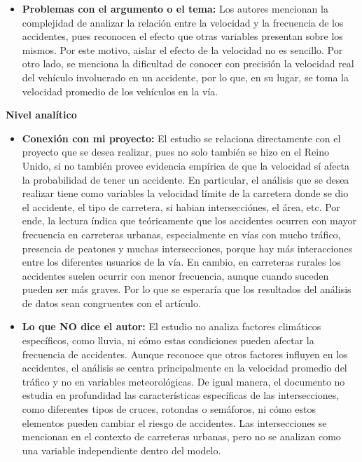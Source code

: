 \documentclass[12pt]{article}
\begin{document}
\begin{itemize}
    \item \textbf{Problemas con el argumento o el tema:} Los autores mencionan la complejidad de analizar la relación entre la velocidad y la frecuencia de los accidentes, pues reconocen el efecto que otras variables presentan sobre los mismos. Por este motivo, aislar el efecto de la velocidad no es sencillo. Por otro lado, se menciona la dificultad de conocer con precisión la velocidad real del vehículo involucrado en un accidente, por lo que, en su lugar, se toma la velocidad promedio de los vehículos en la vía.  \\
    \end{itemize}

\textbf{Nivel analítico}

\begin{itemize}
  \item \textbf{Conexión con mi proyecto:} El estudio se relaciona directamente con el proyecto que se desea realizar, pues no solo también se hizo en el Reino Unido, si no también provee evidencia empírica de que la velocidad sí afecta la probabilidad de tener un accidente. En particular, el análisis que se desea realizar tiene como variables la velocidad límite de la carretera donde se dio el accidente, el tipo de carretera, si habian intersecciónes, el área, etc. Por ende, la lectura índica que teóricamente que los accidentes ocurren con mayor frecuencia en carreteras urbanas, especialmente en vías con mucho tráfico, presencia de peatones y muchas intersecciones, porque hay más interacciones entre los diferentes usuarios de la vía. En cambio, en carreteras rurales los accidentes suelen ocurrir con menor frecuencia, aunque cuando suceden pueden ser más graves. Por lo que se esperaría que los resultados del análisis de datos sean congruentes con el artículo.  
 
	\item \textbf{Lo que NO dice el autor:} El estudio no analiza factores climáticos específicos, como lluvia, ni cómo estas condiciones pueden afectar la frecuencia de accidentes. Aunque reconoce que otros factores influyen en los accidentes, el análisis se centra principalmente en la velocidad promedio del tráfico y no en variables meteorológicas. De igual manera, el documento no estudia en profundidad las características específicas de las intersecciones, como diferentes tipos de cruces, rotondas o semáforos, ni cómo estos elementos pueden cambiar el riesgo de accidentes. Las intersecciones se mencionan en el contexto de carreteras urbanas, pero no se analizan como una variable independiente dentro del modelo. 


\end{itemize}
\end{document}
